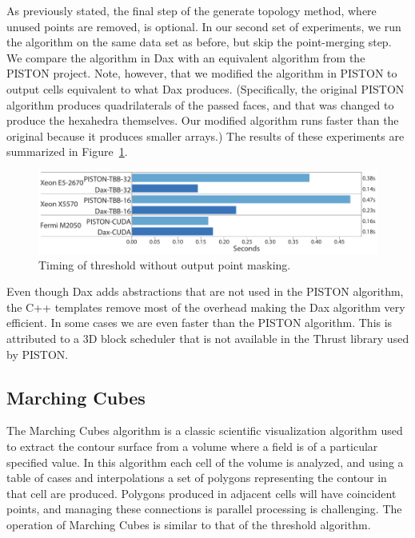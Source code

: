 As previously stated, the final step of the generate topology method, where
unused points are removed, is optional. In our second set of experiments,
we run the algorithm on the same data set as before, but skip the
point-merging step. We compare the algorithm in Dax with an equivalent
algorithm from the PISTON project. Note, however, that we modified the
algorithm in PISTON to output cells equivalent to what Dax
produces. (Specifically, the original PISTON algorithm produces
quadrilaterals of the passed faces, and that was changed to produce the
hexahedra themselves. Our modified algorithm runs faster than the original
because it produces smaller arrays.) The results of these experiments are
summarized in Figure~\ref{fig:TimingThresholdNoPointMask}.

\begin{figure}[htb]
  \centering
  \includegraphics{images/TimingThresholdNoPointMask}
  \caption{Timing of threshold without output point masking.}
  \label{fig:TimingThresholdNoPointMask}
\end{figure}

Even though Dax adds abstractions that are not used in the PISTON
algorithm, the C++ templates remove most of the overhead making the Dax
algorithm very efficient. In some cases we are even faster than the PISTON
algorithm. This is attributed to a 3D block scheduler that is not available
in the Thrust library used by PISTON.

\subsection{Marching Cubes}

The Marching Cubes algorithm is a classic scientific
visualization algorithm used to extract the contour surface from a volume
where a field is of a particular specified value. In this algorithm each
cell of the volume is analyzed, and using a table of cases and
interpolations a set of polygons representing the contour in that cell are
produced. Polygons produced in adjacent cells will have coincident points,
and managing these connections is parallel processing is challenging. The
operation of Marching Cubes is similar to that of the threshold algorithm.

